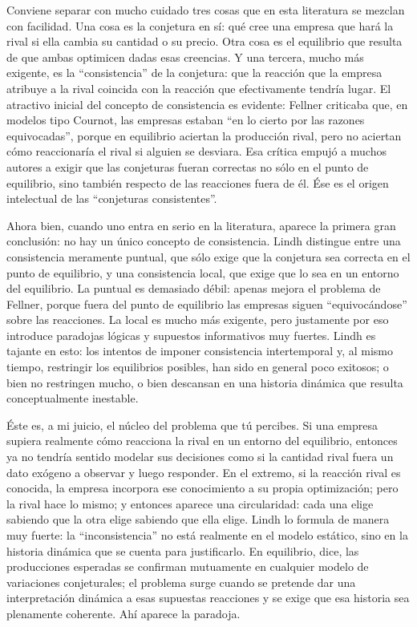 \documentclass[10pt,a4paper]{article}
\begin{document}
Conviene separar con mucho cuidado tres cosas que en esta literatura se mezclan con facilidad. Una cosa es la conjetura en sí: qué cree una empresa que hará la rival si ella cambia su cantidad o su precio. Otra cosa es el equilibrio que resulta de que ambas optimicen dadas esas creencias. Y una tercera, mucho más exigente, es la “consistencia” de la conjetura: que la reacción que la empresa atribuye a la rival coincida con la reacción que efectivamente tendría lugar. El atractivo inicial del concepto de consistencia es evidente: Fellner criticaba que, en modelos tipo Cournot, las empresas estaban “en lo cierto por las razones equivocadas”, porque en equilibrio aciertan la producción rival, pero no aciertan cómo reaccionaría el rival si alguien se desviara. Esa crítica empujó a muchos autores a exigir que las conjeturas fueran correctas no sólo en el punto de equilibrio, sino también respecto de las reacciones fuera de él. Ése es el origen intelectual de las “conjeturas consistentes”. 

Ahora bien, cuando uno entra en serio en la literatura, aparece la primera gran conclusión: no hay un único concepto de consistencia. Lindh distingue entre una consistencia meramente puntual, que sólo exige que la conjetura sea correcta en el punto de equilibrio, y una consistencia local, que exige que lo sea en un entorno del equilibrio. La puntual es demasiado débil: apenas mejora el problema de Fellner, porque fuera del punto de equilibrio las empresas siguen “equivocándose” sobre las reacciones. La local es mucho más exigente, pero justamente por eso introduce paradojas lógicas y supuestos informativos muy fuertes. Lindh es tajante en esto: los intentos de imponer consistencia intertemporal y, al mismo tiempo, restringir los equilibrios posibles, han sido en general poco exitosos; o bien no restringen mucho, o bien descansan en una historia dinámica que resulta conceptualmente inestable.  

Éste es, a mi juicio, el núcleo del problema que tú percibes. Si una empresa supiera realmente cómo reacciona la rival en un entorno del equilibrio, entonces ya no tendría sentido modelar sus decisiones como si la cantidad rival fuera un dato exógeno a observar y luego responder. En el extremo, si la reacción rival es conocida, la empresa incorpora ese conocimiento a su propia optimización; pero la rival hace lo mismo; y entonces aparece una circularidad: cada una elige sabiendo que la otra elige sabiendo que ella elige. Lindh lo formula de manera muy fuerte: la “inconsistencia” no está realmente en el modelo estático, sino en la historia dinámica que se cuenta para justificarlo. En equilibrio, dice, las producciones esperadas se confirman mutuamente en cualquier modelo de variaciones conjeturales; el problema surge cuando se pretende dar una interpretación dinámica a esas supuestas reacciones y se exige que esa historia sea plenamente coherente. Ahí aparece la paradoja.
\end{document}
